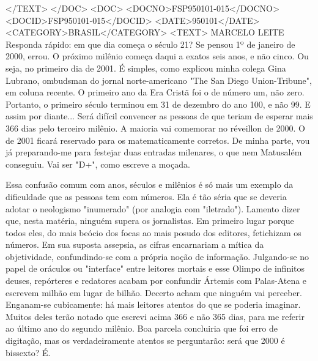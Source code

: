 </TEXT>
</DOC>
<DOC>
<DOCNO>FSP950101-015</DOCNO>
<DOCID>FSP950101-015</DOCID>
<DATE>950101</DATE>
<CATEGORY>BRASIL</CATEGORY>
<TEXT>
MARCELO LEITE 
Responda rápido: em que dia começa o século 21? Se pensou 1º de janeiro de 2000, errou. O próximo milênio começa daqui a exatos seis anos, e não cinco. Ou seja, no primeiro dia de 2001.
É simples, como explicou minha colega Gina Lubrano, ombudsman do jornal norte-americano "The San Diego Union-Tribune", em coluna recente.
O primeiro ano da Era Cristã foi o de número um, não zero. Portanto, o primeiro século terminou em 31 de dezembro do ano 100, e não 99. E assim por diante...
Será difícil convencer as pessoas de que teriam de esperar mais 366 dias pelo terceiro milênio. A maioria vai comemorar no réveillon de 2000. O de 2001 ficará reservado para os matematicamente corretos.
De minha parte, vou já preparando-me para festejar duas entradas milenares, o que nem Matusalém conseguiu. Vai ser "D+", como escreve a moçada.
 
Essa confusão comum com anos, séculos e milênios é só mais um exemplo da dificuldade que as pessoas tem com números. Ela é tão séria que se deveria adotar o neologismo "inumerado" (por analogia com "iletrado").
Lamento dizer que, nesta matéria, ninguém supera os jornalistas.
Em primeiro lugar porque todos eles, do mais beócio dos focas ao mais posudo dos editores, fetichizam os números. Em sua suposta assepsia, as cifras encarnariam a mítica da objetividade, confundindo-se com a própria noção de informação.
Julgando-se no papel de oráculos ou "interface" entre leitores mortais e esse Olimpo de infinitos deuses, repórteres e redatores acabam por confundir Ártemis com Palas-Atena e escrevem milhão em lugar de bilhão. Decerto acham que ninguém vai perceber.
Enganam-se cubicamente: há mais leitores atentos do que se poderia imaginar. Muitos deles terão notado que escrevi acima 366 e não 365 dias, para me referir ao último ano do segundo milênio. Boa parcela concluiria que foi erro de digitação, mas os verdadeiramente atentos se perguntarão: será que 2000 é bissexto?
É.
 
